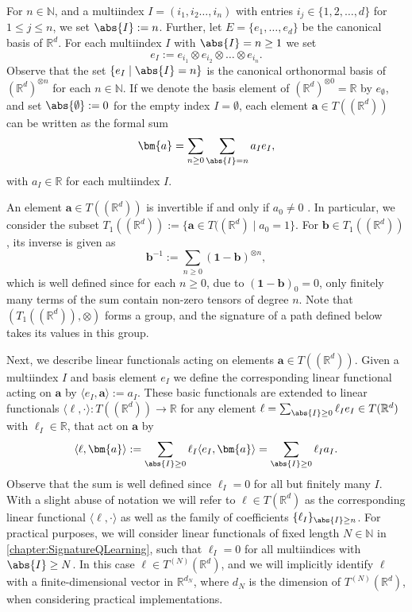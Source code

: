 \documentclass[
    a4paper,
    11pt,
    bibliography=totoc,
    listof=totoc,      
    headinclude=true,
    cleardoublepage=empty,
]{scrbook}
\theoremstyle{plain}
\theoremstyle{definition}
\theoremstyle{remark}
\newcommand{\SetR}{\mathbb R}
\newcommand{\SetN}{\mathbb N}
\begin{document}
For $n\in\SetN$, and a multiindex $I=(i_1, i_2\dots,i_n)$ with entries 
$i_j\in\{1,2,\dots,d\}$ for $1\leq j \leq n$, we set $\abs{I}:= n$. Further, 
let $E = \{e_1,\dots, e_d\}$ be the canonical basis of $\SetR^d$. For each multiindex $I$ with $\abs{I} = n \geq 1$ we set
\[
    e_I := e_{i_1}\otimes e_{i_2}\otimes \dots \otimes e_{i_n}.
\]
Observe that the set $\{e_I \mid \abs{I} = n\}$ is the canonical orthonormal 
basis of $(\SetR^d)^{\otimes n}$ for each $n\in\SetN$. If we denote the basis 
element of $(\SetR^d)^{\otimes 0} = \SetR$ by $e_\emptyset$, and set 
$\abs{\emptyset} := 0$ for the empty index $I=\emptyset$, each element 
$\bm{a}\in T((\SetR^d))$ can be written as the formal sum
\[
    \bm{a} = \sum_{n\geq0}\sum_{\abs{I}=n} a_Ie_I,
\]
with $a_I\in\SetR$ for each multiindex $I$.

An element $\bm{a}\in T((\SetR^d))$ is invertible if and only if
$a_0\neq0$ \cite{lyons2007_dedrp}. In particular, we consider the subset 
$T_1((\SetR^d)) := \{\bm{a}\in T((\SetR^d)\mid a_0 = 1\}$. For 
$\bm{b}\in T_1((\SetR^d))$, its inverse is given as
\[
    \bm{b}^{-1} := \sum_{n\geq 0} (\bm{1} - \bm{b})^{\otimes n},
\]
which is well defined since for each $n\geq 0$, due to $(\bm 1-\bm{b})_0 = 0$,
only finitely many terms of the sum contain non-zero tensors of degree $n$.
Note that $(T_1((\SetR^d)), \otimes)$ forms a group, and the signature
of a path defined below takes its values in this group.

Next, we describe linear functionals acting on elements $\bm{a}\in
T((\SetR^d))$. Given a multiindex $I$ and basis element $e_I$ we define the
corresponding linear functional acting on $\bm{a}$ by $\langle e_I,\bm{a}
\rangle := a_I$. These basic functionals are extended to linear functionals
$\langle \ell, \cdot \rangle: T((\SetR^d)) \to \SetR$ for any element $\ell = 
\sum_{\abs{I}\geq 0} \ell_I e_I \in T(\SetR^d)$ with $\ell_I \in\SetR$, that 
act on $\bm{a}$ by 
\[
    \langle \ell, \bm{a} \rangle
    := \sum_{\abs{I} \geq 0} \ell_I \langle e_I, \bm{a} \rangle
    = \sum_{\abs{I}\geq 0} \ell_I a_I.
\]
Observe that the sum is well defined since $\ell_I=0$ for all but finitely
many $I$. With a slight abuse of notation we will refer to 
$\ell\in T(\SetR^d)$ as the corresponding linear functional $ \langle \ell,
\cdot \rangle$ as well as the family of coefficients 
$\{\ell_I\}_{\abs{I}\geq n}$. For practical purposes, we will consider linear 
functionals of fixed length $N\in\SetN$ in \cref{chapter:SignatureQLearning}, 
such that $\ell_I = 0$ for all multiindices with $\abs{I}\geq N$. In 
this case $\ell \in T^{(N)}(\SetR^d)$, and we will implicitly identify $\ell$
with a finite-dimensional vector in $\SetR^{d_N}$, where $d_N$ is the 
dimension  of $T^{(N)}(\SetR^d)$, when considering practical implementations.
\end{document}
